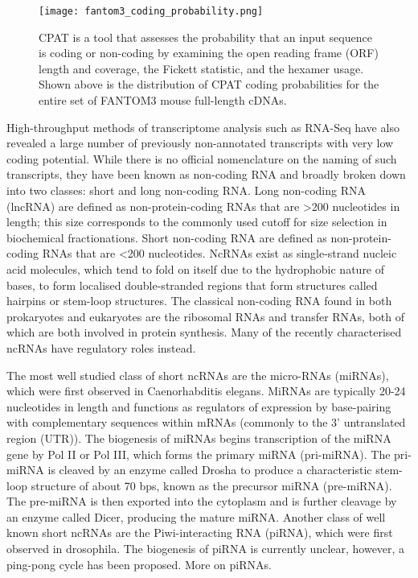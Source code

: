 \begin{figure}[!ht]
   \centering
   \texttt{[image: fantom3\_coding\_probability.png]}
   \caption[Coding probability of FANTOM3 mouse cDNAs]{CPAT is a tool that assesses the probability that an input sequence is coding or non-coding by examining the open reading frame (ORF) length and coverage, the Fickett statistic\cite{pmid7145702}, and the hexamer usage. Shown above is the distribution of CPAT coding probabilities for the entire set of FANTOM3 mouse full-length cDNAs\cite{tang2014fantom3codingprob}.}
   \label{fig:fantom3_coding_prob}
\end{figure}

High-throughput methods of transcriptome analysis such as RNA-Seq have also revealed a large number of previously non-annotated transcripts with very low coding potential. While there is no official nomenclature on the naming of such transcripts, they have been known as non-coding RNA and broadly broken down into two classes: short and long non-coding RNA. Long non-coding RNA (lncRNA) are defined as non-protein-coding RNAs that are >200 nucleotides in length; this size corresponds to the commonly used cutoff for size selection in biochemical fractionations. Short non-coding RNA are defined as non-protein-coding RNAs that are <200 nucleotides. NcRNAs exist as single-strand nucleic acid molecules, which tend to fold on itself due to the hydrophobic nature of bases, to form localised double-stranded regions that form structures called hairpins or stem-loop structures. The classical non-coding RNA found in both prokaryotes and eukaryotes are the ribosomal RNAs and transfer RNAs, both of which are both involved in protein synthesis. Many of the recently characterised ncRNAs have regulatory roles instead\cite{pmid24776770}.

The most well studied class of short ncRNAs are the micro-RNAs (miRNAs), which were first observed in Caenorhabditis elegans\cite{pmid8252621}. MiRNAs are typically 20-24 nucleotides in length and functions as regulators of expression by base-pairing with complementary sequences within mRNAs (commonly to the 3' untranslated region (UTR)). The biogenesis of miRNAs begins transcription of the miRNA gene by Pol II or Pol III, which forms the primary miRNA (pri-miRNA). The pri-miRNA is cleaved by an enzyme called Drosha\cite{pmid14508493} to produce a characteristic stem-loop structure of about 70 bps, known as the precursor miRNA (pre-miRNA). The pre-miRNA is then exported into the cytoplasm and is further cleavage by an enzyme called Dicer\cite{pmid11201747}, producing the mature miRNA. Another class of well known short ncRNAs are the Piwi-interacting RNA (piRNA), which were first observed in drosophila\cite{pmid11470406}. The biogenesis of piRNA is currently unclear, however, a ping-pong cycle has been proposed\cite{pmid21427766}. More on piRNAs.

